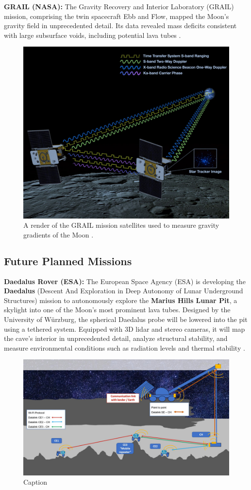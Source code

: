 \textbf{GRAIL (NASA):} 
The Gravity Recovery and Interior Laboratory (GRAIL) mission, comprising the twin spacecraft Ebb and Flow, mapped the Moon’s gravity field in unprecedented detail. Its data revealed mass deficits consistent with large subsurface voids, including potential lava tubes \cite{GRAIL}.

\begin{figure}[H]
    \centering
    \includegraphics[width=0.52\linewidth]{grail.png}
    \caption{A render of the GRAIL mission satellites used to measure gravity gradients of the Moon \cite{GRAIL}.}
    \label{fig:grail-render}
\end{figure}

\subsection{Future Planned Missions}


\textbf{Daedalus Rover (ESA):} 
The European Space Agency (ESA) is developing the \textbf{Daedalus} (Descent And Exploration in Deep Autonomy of Lunar Underground Structures) mission to autonomously explore the \textbf{Marius Hills Lunar Pit}, a skylight into one of the Moon’s most prominent lava tubes. Designed by the University of Würzburg, the spherical Daedalus probe will be lowered into the pit using a tethered system. Equipped with 3D lidar and stereo cameras, it will map the cave’s interior in unprecedented detail, analyze structural stability, and measure environmental conditions such as radiation levels and thermal stability \cite{esa-daedalus}.

\begin{figure}[H]
    \centering
    \includegraphics[width=0.8\linewidth]{daedalus-schema.png}
    \caption{Caption}
    \label{fig:daedalus-mission-schema}
\end{figure}

